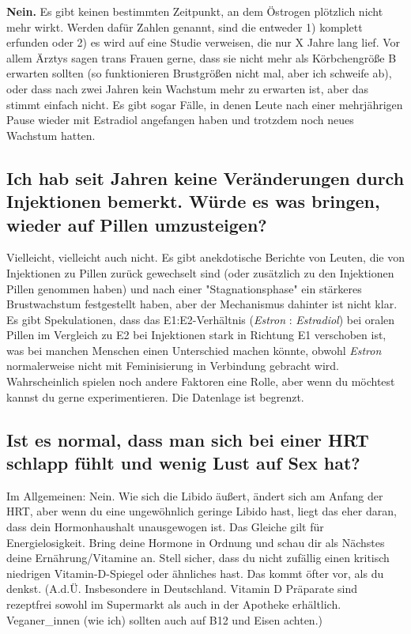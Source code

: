 \documentclass{article}
\begin{document}
\textbf{Nein.} Es gibt keinen bestimmten Zeitpunkt, an dem Östrogen plötzlich nicht mehr wirkt. Werden dafür Zahlen genannt, sind die entweder 1) komplett erfunden oder 2) es wird auf eine Studie verweisen, die nur X Jahre lang lief. Vor allem Ärztys sagen trans Frauen gerne, dass sie nicht mehr als Körbchengröße B erwarten sollten (so funktionieren Brustgrößen nicht mal, aber ich schweife ab), oder dass nach zwei Jahren kein Wachstum mehr zu erwarten ist, aber das stimmt einfach nicht. Es gibt sogar Fälle, in denen Leute nach einer mehrjährigen Pause wieder mit Estradiol angefangen haben und trotzdem noch neues Wachstum hatten.

\subsection{Ich hab seit Jahren keine Veränderungen durch Injektionen bemerkt. Würde es was bringen, wieder auf Pillen umzusteigen?}

Vielleicht, vielleicht auch nicht. Es gibt anekdotische Berichte von Leuten, die von Injektionen zu Pillen zurück gewechselt sind (oder zusätzlich zu den Injektionen Pillen genommen haben) und nach einer "Stagnationsphase" ein stärkeres Brustwachstum festgestellt haben, aber der Mechanismus dahinter ist nicht klar. Es gibt Spekulationen, dass das E1:E2-Verhältnis (\textit{Estron} : \textit{Estradiol}) bei oralen Pillen im Vergleich zu E2 bei Injektionen stark in Richtung E1 verschoben ist, was bei manchen Menschen einen Unterschied machen könnte, obwohl \textit{Estron} normalerweise nicht mit Feminisierung in Verbindung gebracht wird. Wahrscheinlich spielen noch andere Faktoren eine Rolle, aber wenn du möchtest kannst du gerne experimentieren. Die Datenlage ist begrenzt.

\subsection{Ist es normal, dass man sich bei einer HRT schlapp fühlt und wenig Lust auf Sex hat?}

Im Allgemeinen: Nein. Wie sich die Libido äußert, ändert sich am Anfang der HRT, aber wenn du eine ungewöhnlich geringe Libido hast, liegt das eher daran, dass dein Hormonhaushalt unausgewogen ist. Das Gleiche gilt für Energielosigkeit. Bring deine Hormone in Ordnung und schau dir als Nächstes deine Ernährung/Vitamine an. Stell sicher, dass du nicht zufällig einen kritisch niedrigen Vitamin-D-Spiegel oder ähnliches hast. Das kommt öfter vor, als du denkst. (A.d.Ü. Insbesondere in Deutschland. Vitamin D Präparate sind rezeptfrei sowohl im Supermarkt als auch in der Apotheke erhältlich. Veganer\_innen (wie ich) sollten auch auf B12 und Eisen achten.)
\end{document}
